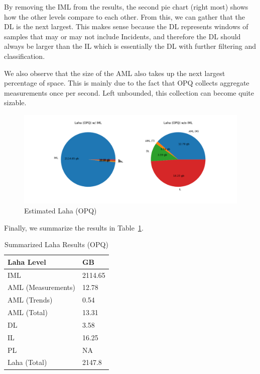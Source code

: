 By removing the IML from the results, the second pie chart (right most) shows how the other levels compare to each other. From this, we can gather that the DL is the next largest. This makes sense because the DL represents windows of samples that may or may not include Incidents, and therefore the DL should always be larger than the IL which is essentially the DL with further filtering and classification.

We also observe that the size of the AML also takes up the next largest percentage of space. This is mainly due to the fact that OPQ collects aggregate measurements once per second. Left unbounded, this collection can become quite sizable.

\begin{figure}[H]
	\centering
	\includegraphics[width=\linewidth]{figures/plot_laha_opq_pie.png}
	\caption{Estimated Laha (OPQ)}
	\label{fig:plot_lala_opq_pie}
\end{figure}

Finally, we summarize the results in Table~\ref{table:summarized_laha_results_opq}.

\begin{table}[H]
	\centering
	\caption{Summarized Laha Results (OPQ)}
	\begin{tabularx}{\textwidth}{ll}
		\toprule
		\textbf{Laha Level} & \bm{$\mu Size$} \textbf{GB} \\
		\midrule
		IML & 2114.65 \\
		AML (Measurements) & 12.78 \\
		AML (Trends) & 0.54  \\
		AML (Total) & 13.31  \\
		DL & 3.58  \\
		IL & 16.25  \\
		PL & NA  \\
		Laha (Total) & 2147.8  \\
		\bottomrule
	\end{tabularx}
	\label{table:summarized_laha_results_opq}
\end{table}

